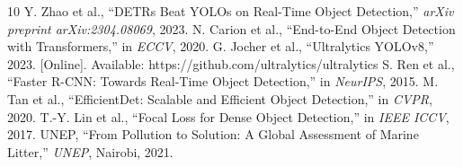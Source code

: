 \documentclass[10pt,journal,compsoc]{IEEEtran}
\begin{document}
\begin{thebibliography}{10}
 Y. Zhao et al., ``DETRs Beat YOLOs on Real-Time Object Detection,'' \emph{arXiv preprint arXiv:2304.08069}, 2023.
 N. Carion et al., ``End-to-End Object Detection with Transformers,'' in \emph{ECCV}, 2020.
 G. Jocher et al., ``Ultralytics YOLOv8,'' 2023. [Online]. Available: https://github.com/ultralytics/ultralytics
 S. Ren et al., ``Faster R-CNN: Towards Real-Time Object Detection,'' in \emph{NeurIPS}, 2015.
 M. Tan et al., ``EfficientDet: Scalable and Efficient Object Detection,'' in \emph{CVPR}, 2020.
 T.-Y. Lin et al., ``Focal Loss for Dense Object Detection,'' in \emph{IEEE ICCV}, 2017.
 UNEP, ``From Pollution to Solution: A Global Assessment of Marine Litter,'' \emph{UNEP}, Nairobi, 2021.
\end{thebibliography}
\end{document}
